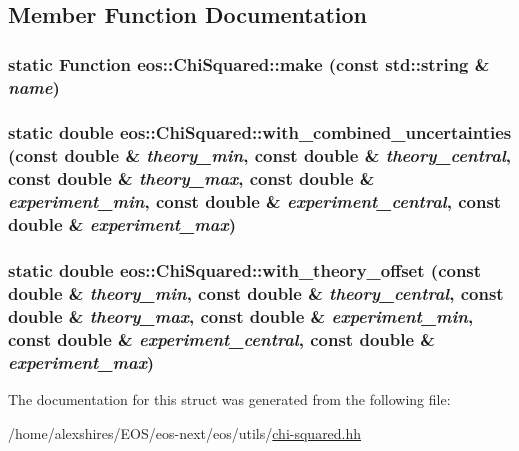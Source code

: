 \subsection{Member Function Documentation}
\hypertarget{structeos_1_1ChiSquared_af6ffe7a8101cbc26a837d8359d9784ee}{
\subsubsection[{make}]{\setlength{\rightskip}{0pt plus 5cm}static {\bf Function} eos::ChiSquared::make (const std::string \& {\em name})}}
\label{structeos_1_1ChiSquared_af6ffe7a8101cbc26a837d8359d9784ee}
\hypertarget{structeos_1_1ChiSquared_abaedf2005be3dd65831edfae46e97df5}{
\subsubsection[{with\_\-combined\_\-uncertainties}]{\setlength{\rightskip}{0pt plus 5cm}static double eos::ChiSquared::with\_\-combined\_\-uncertainties (const double \& {\em theory\_\-min}, \/  const double \& {\em theory\_\-central}, \/  const double \& {\em theory\_\-max}, \/  const double \& {\em experiment\_\-min}, \/  const double \& {\em experiment\_\-central}, \/  const double \& {\em experiment\_\-max})}}
\label{structeos_1_1ChiSquared_abaedf2005be3dd65831edfae46e97df5}
\hypertarget{structeos_1_1ChiSquared_a842a35bc7a2117ec1caa5f255795e3e7}{
\subsubsection[{with\_\-theory\_\-offset}]{\setlength{\rightskip}{0pt plus 5cm}static double eos::ChiSquared::with\_\-theory\_\-offset (const double \& {\em theory\_\-min}, \/  const double \& {\em theory\_\-central}, \/  const double \& {\em theory\_\-max}, \/  const double \& {\em experiment\_\-min}, \/  const double \& {\em experiment\_\-central}, \/  const double \& {\em experiment\_\-max})}}
\label{structeos_1_1ChiSquared_a842a35bc7a2117ec1caa5f255795e3e7}


The documentation for this struct was generated from the following file:\begin{DoxyCompactItemize}
\item 
/home/alexshires/EOS/eos-\/next/eos/utils/\hyperlink{chi-squared_8hh}{chi-\/squared.hh}\end{DoxyCompactItemize}
